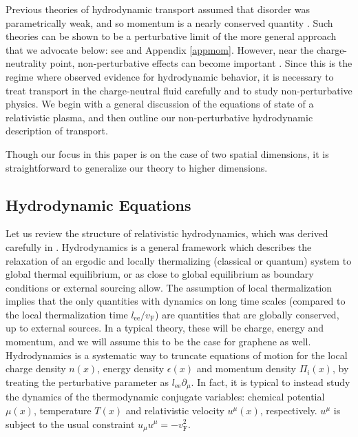 Previous theories of hydrodynamic transport assumed that disorder was parametrically weak, and so momentum is a nearly conserved quantity \cite{hartnoll_theory_2007, muller_collective_2008}.    Such theories can be shown to be a perturbative limit of the more general approach that we advocate below: see \cite{lucas_hydrodynamic_2015} and Appendix \ref{appmom}.    However, near the charge-neutrality point, non-perturbative effects can become important \cite{lucas_hydrodynamic_2015}.  Since this is the regime where \cite{crossno_observation_2016} observed evidence for hydrodynamic behavior, it is necessary to treat transport in the charge-neutral fluid carefully and to study non-perturbative physics.   We begin with a general discussion of the equations of state of a relativistic plasma, and then outline our non-perturbative hydrodynamic description of  transport.

Though our focus in this paper is on the case of two spatial dimensions, it is straightforward to generalize our theory to higher dimensions.


\subsection{Hydrodynamic Equations}
Let us review the structure of relativistic hydrodynamics, which was derived carefully in \cite{hartnoll_theory_2007}.  Hydrodynamics is a general framework which describes the relaxation of an ergodic and locally thermalizing (classical or quantum) system  to global thermal equilibrium, or as close to global equilibrium as boundary conditions or external sourcing allow.
The assumption of local thermalization implies that the only quantities with dynamics on long time scales (compared to the local thermalization time $l_{\mathrm{ee}}/v_{\mathrm{F}}$)  are quantities that are globally conserved, up to external sources.    In a typical theory, these will be charge, energy and momentum, and we will assume this to be the case for graphene as well.     
Hydrodynamics is a systematic way to truncate equations of motion for the local charge density $n(x)$,   energy density $\epsilon(x)$ and momentum density $\Pi_i(x)$, by treating the perturbative parameter as $l_{\mathrm{ee}} \partial_\mu$.    In fact, it is typical to instead study the dynamics of the thermodynamic conjugate variables: chemical potential $\mu(x)$, temperature $T(x)$ and relativistic velocity $u^\mu(x)$, respectively.  $u^\mu$ is subject to the usual constraint $u_\mu u^\mu = -v_{\mathrm{F}}^2$.

